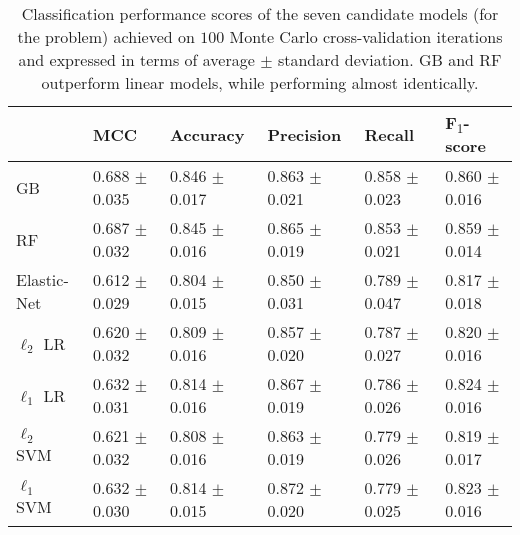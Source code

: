 \begin{table}
\centering
\begin{tabular}{llllll}
\toprule
{} &                MCC &           Accuracy &          Precision &             Recall &                 F\textsubscript{$1$}-score \\
\midrule
GB      &  0.688 $\pm$ 0.035 &  0.846 $\pm$ 0.017 &  0.863 $\pm$ 0.021 &  0.858 $\pm$ 0.023 &  0.860 $\pm$ 0.016 \\
RF         &  0.687 $\pm$ 0.032 &  0.845 $\pm$ 0.016 &  0.865 $\pm$ 0.019 &  0.853 $\pm$ 0.021 &  0.859 $\pm$ 0.014 \\
Elastic-Net                   &  0.612 $\pm$ 0.029 &  0.804 $\pm$ 0.015 &  0.850 $\pm$ 0.031 &  0.789 $\pm$ 0.047 &  0.817 $\pm$ 0.018 \\
$\ell_2$ LR &  0.620 $\pm$ 0.032 &  0.809 $\pm$ 0.016 &  0.857 $\pm$ 0.020 &  0.787 $\pm$ 0.027 &  0.820 $\pm$ 0.016 \\
$\ell_1$ LR &  0.632 $\pm$ 0.031 &  0.814 $\pm$ 0.016 &  0.867 $\pm$ 0.019 &  0.786 $\pm$ 0.026 &  0.824 $\pm$ 0.016 \\
$\ell_2$ SVM          &  0.621 $\pm$ 0.032 &  0.808 $\pm$ 0.016 &  0.863 $\pm$ 0.019 &  0.779 $\pm$ 0.026 &  0.819 $\pm$ 0.017 \\
$\ell_1$ SVM          &  0.632 $\pm$ 0.030 &  0.814 $\pm$ 0.015 &  0.872 $\pm$ 0.020 &  0.779 $\pm$ 0.025 &  0.823 $\pm$ 0.016 \\
\bottomrule
\end{tabular}
\caption{Classification performance scores of the seven candidate models (for the \F problem) achieved on $100$ Monte Carlo cross-validation iterations and expressed in terms of average $\pm$ standard deviation. GB and RF outperform linear models, while performing almost identically.} \label{tab:f_scoreboard}
\end{table}
